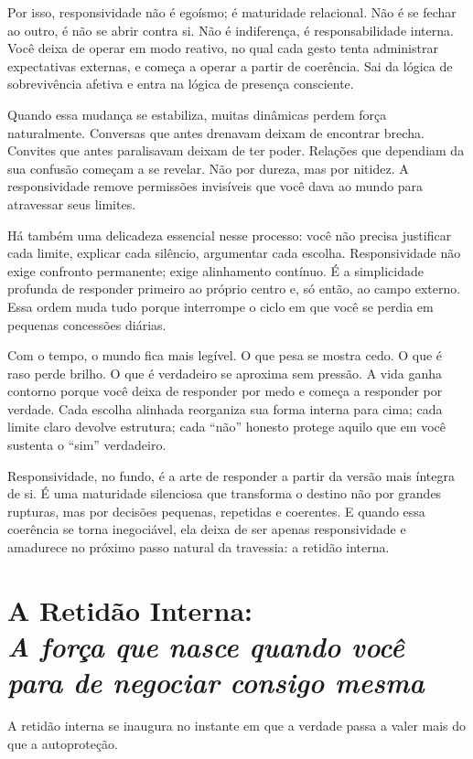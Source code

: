 \documentclass[12pt]{book}
\begin{document}
Por isso, responsividade não é egoísmo; é maturidade relacional. Não é se fechar ao outro, é não se abrir contra si. Não é indiferença, é responsabilidade interna. Você deixa de operar em modo reativo, no qual cada gesto tenta administrar expectativas externas, e começa a operar a partir de coerência. Sai da lógica de sobrevivência afetiva e entra na lógica de presença consciente.

Quando essa mudança se estabiliza, muitas dinâmicas perdem força naturalmente. Conversas que antes drenavam deixam de encontrar brecha. Convites que antes paralisavam deixam de ter poder. Relações que dependiam da sua confusão começam a se revelar. Não por dureza, mas por nitidez. A responsividade remove permissões invisíveis que você dava ao mundo para atravessar seus limites.

Há também uma delicadeza essencial nesse processo: você não precisa justificar cada limite, explicar cada silêncio, argumentar cada escolha. Responsividade não exige confronto permanente; exige alinhamento contínuo. É a simplicidade profunda de responder primeiro ao próprio centro e, só então, ao campo externo. Essa ordem muda tudo porque interrompe o ciclo em que você se perdia em pequenas concessões diárias.

Com o tempo, o mundo fica mais legível. O que pesa se mostra cedo. O que é raso perde brilho. O que é verdadeiro se aproxima sem pressão. A vida ganha contorno porque você deixa de responder por medo e começa a responder por verdade. Cada escolha alinhada reorganiza sua forma interna para cima; cada limite claro devolve estrutura; cada “não” honesto protege aquilo que em você sustenta o “sim” verdadeiro.

Responsividade, no fundo, é a arte de responder a partir da versão mais íntegra de si. É uma maturidade silenciosa que transforma o destino não por grandes rupturas, mas por decisões pequenas, repetidas e coerentes. E quando essa coerência se torna inegociável, ela deixa de ser apenas responsividade e amadurece no próximo passo natural da travessia: a retidão interna.


\chapter[A Retidão Interna: A força que nasce quando você para de negociar consigo mesma]{A Retidão Interna:\\[0.4ex]\large\itshape A força que nasce quando você para de negociar consigo mesma}

A retidão interna se inaugura no instante em que a verdade passa a valer mais do que a autoproteção.
\end{document}

